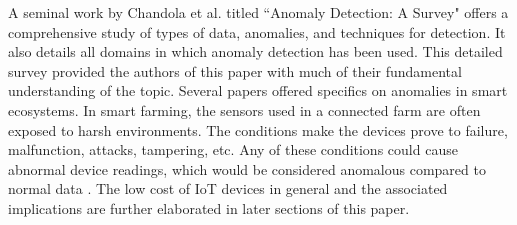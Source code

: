 A seminal work by Chandola et al. \cite{chandola2009anomaly} titled ``Anomaly Detection: A Survey" offers a comprehensive study of types of data, anomalies, and techniques for detection. It also details all domains in which anomaly detection has been used. This detailed survey provided the authors of this paper with much of their fundamental understanding of the topic. Several papers \cite{park2021anomaly,hasan2019attack, cook2019anomaly, luo2018distributed, chukkapalli2020ontologies, sedjelmaci2016lightweight,kimmell2021analyzing,gupta2021detecting} offered specifics on anomalies in smart ecosystems. In smart farming, the sensors used in a connected farm are often exposed to harsh environments. The conditions make the devices prove to failure, malfunction, attacks, tampering, etc. Any of these conditions could cause abnormal device readings, which would be considered anomalous compared to normal data \cite{gaddam2020detecting}. The low cost of IoT devices in general and the associated implications are further elaborated in later sections of this paper. 
